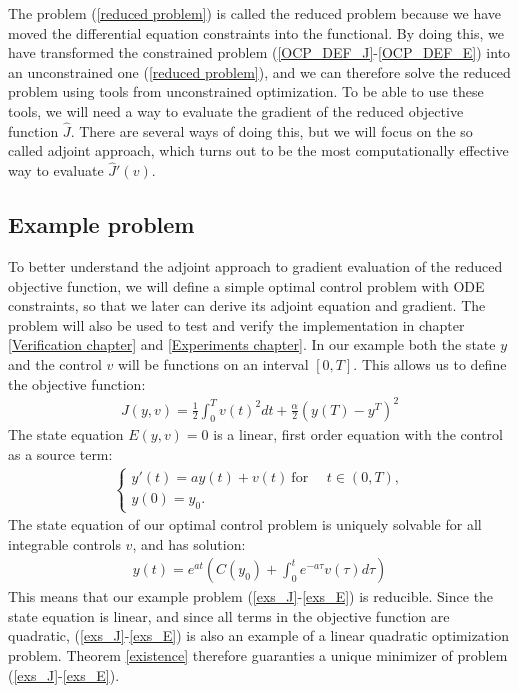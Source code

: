 \noindent
The problem (\ref{reduced problem}) is called the reduced problem because we have moved the differential equation constraints into the functional. By doing this, we have transformed the constrained problem (\ref{OCP_DEF_J}-\ref{OCP_DEF_E}) into an unconstrained one (\ref{reduced problem}), and we can therefore solve the reduced problem using tools from unconstrained optimization. To be able to use these tools, we will need a way to evaluate the gradient of the reduced objective function $\hat J$. There are several ways of doing this, but we will focus on the so called adjoint approach, which turns out to be the most computationally effective way to evaluate $\hat J'(v)$.  
\subsection{Example problem} \label{example_sec}
To better understand the adjoint approach to gradient evaluation of the reduced objective function, we will define a simple optimal control problem with ODE constraints, so that we later can derive its adjoint equation and gradient. The problem will also be used to test and verify the implementation in chapter \ref{Verification chapter} and \ref{Experiments chapter}. In our example both the state $y$ and the control $v$ will be functions on an interval $[0,T]$. This allows us to define the objective function:
\begin{align}
J(y,v) = \frac{1}{2}\int_0^Tv(t)^2dt + \frac{\alpha}{2}(y(T)-y^T)^2 \label{exs_J}
\end{align}
The state equation $E(y,v)=0$ is a linear, first order equation with the control as a source term:
\begin{align}
\left\{
     \begin{array}{lr}
       	y'(t)=ay(t) + v(t) \ \textrm{for } \quad t\in(0,T),\\
       	y(0)=y_0.
     \end{array}
   \right. \label{exs_E}
\end{align}
The state equation of our optimal control problem is uniquely solvable for all integrable controls $v$, and has solution:
\begin{align*}
y(t) = e^{a t}(C(y_0)+\int_0^te^{-a\tau}v(\tau)d\tau)
\end{align*}
This means that our example problem (\ref{exs_J}-\ref{exs_E}) is reducible. Since the state equation is linear, and since all terms in the objective function are quadratic, (\ref{exs_J}-\ref{exs_E}) is also an example of a linear quadratic optimization problem. Theorem \ref{existence} therefore guaranties a unique minimizer of problem (\ref{exs_J}-\ref{exs_E}).
